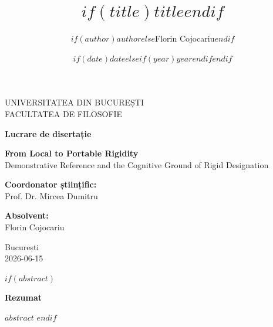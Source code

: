 \documentclass[12pt,a4paper]{article}
\title{$if(title)$$title$$endif$}
\author{$if(author)$$author$$else$Florin Cojocariu$endif$}
\date{$if(date)$$date$$else$$if(year)$$year$$endif$$endif$}
\begin{document}
\pagestyle{empty}

\begin{center}
\vspace*{0.5cm}
{\large UNIVERSITATEA DIN BUCUREȘTI}\\[0.3em]
{\large FACULTATEA DE FILOSOFIE}

\vfill

{\large\bfseries Lucrare de disertație}

\vspace{2em}

{\LARGE\bfseries From Local to Portable Rigidity}\\[1em]
{\Large Demonstrative Reference and the Cognitive Ground of Rigid Designation}

\vfill
\end{center}
\noindent
\begin{minipage}[t]{0.45\textwidth}
\raggedright
\textbf{Coordonator științific:}\\
Prof. Dr. Mircea Dumitru
\end{minipage}%
\hfill
\begin{minipage}[t]{0.45\textwidth}
\raggedleft
\textbf{Absolvent:}\\
Florin Cojocariu
\end{minipage}
\vspace{1.5cm}
\begin{center}
{\large București}\\[0.3em]
{\large 2026-06-15}
\end{center}
\clearpage

$if(abstract)$
\begin{center}
{\large\bfseries Rezumat}
\end{center}
\vspace{1em}
\noindent $abstract$
\clearpage
$endif$

\setcounter{tocdepth}{3}
\tableofcontents
\thispagestyle{empty}
\clearpage
\end{document}
